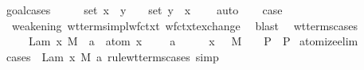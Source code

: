 \begin{isabellebody}
%
\isadelimproof
%
\endisadelimproof
%
\isatagproof
{}\isamarkupfalse%
\ goal{\isacharunderscore}cases\isanewline
{}\isamarkupfalse%
\ {}\isanewline
\ \ \isamarkupfalse%
\ {\isachardoublequoteopen}set\ {\isacharparenleft}{\isacharparenleft}x{\isacharcomma}{\isasymsigma}{\isacharparenright}\ {\isacharhash}\ {\isacharparenleft}y{\isacharcomma}{\isasympi}{\isacharparenright}\ {\isacharhash}\ {\isasymGamma}{\isacharparenright}\ {\isasymsubseteq}\ set\ {\isacharparenleft}{\isacharparenleft}y{\isacharcomma}{\isasympi}{\isacharparenright}\ {\isacharhash}\ {\isacharparenleft}x{\isacharcomma}{\isasymsigma}{\isacharparenright}\ {\isacharhash}\ {\isasymGamma}{\isacharparenright}{\isachardoublequoteclose}\ \isamarkupfalse%
\ auto\isanewline
\ \ \isamarkupfalse%
\ {\isacharquery}case\ \isamarkupfalse%
\ {}\ weakening\ wt{\isacharunderscore}terms{\isacharunderscore}impl{\isacharunderscore}wf{\isacharunderscore}ctxt\ wf{\isacharunderscore}ctxt{\isacharunderscore}exchange\ \isamarkupfalse%
\ blast\isanewline
{}\isamarkupfalse%
%
\endisatagproof
{\isafoldproof}%
%
\isadelimproof
\isanewline
%
\endisadelimproof
\isanewline
{}\isamarkupfalse%
\ \ wt{\isacharunderscore}terms{\isacharunderscore}cases{\isacharunderscore}{}{\isacharcolon}\isanewline
\ \ \ {\isachardoublequoteopen}{\isasymGamma}\ {\isasymturnstile}\ Lam\ {\isacharbrackleft}x{\isacharbrackright}{\isachardot}\ M\ {\isacharcolon}\ a{}\ {\isasymLongrightarrow}\ atom\ x\ {\isasymsharp}\ {\isasymGamma}{\isasymLongrightarrow}\ {\isacharparenleft}{\isasymAnd}{\isasymsigma}\ {\isasymtau}{\isachardot}\ a{}\ {\isacharequal}\ {\isasymsigma}\ {\isasymrightarrow}\ {\isasymtau}\ {\isasymLongrightarrow}\ {\isacharparenleft}{\isacharparenleft}x{\isacharcomma}\ {\isasymsigma}{\isacharparenright}{\isacharhash}{\isasymGamma}{\isacharparenright}\ {\isasymturnstile}\ M\ {\isacharcolon}\ {\isasymtau}\ {\isasymLongrightarrow}\ P{\isacharparenright}\ {\isasymLongrightarrow}\ P{\isachardoublequoteclose}\isanewline
%
\isadelimproof
%
\endisadelimproof
%
\isatagproof
{}\isamarkupfalse%
\ atomize{\isacharunderscore}elim\isanewline
{}\isamarkupfalse%
\ {\isacharparenleft}cases\ {\isasymGamma}\ {\isachardoublequoteopen}Lam\ {\isacharbrackleft}x{\isacharbrackright}{\isachardot}\ M{\isachardoublequoteclose}\ a{}\ rule{\isacharcolon}wt{\isacharunderscore}terms{\isachardot}cases{\isacharcomma}\ simp{\isacharparenright}\isanewline

\end{isabellebody}

